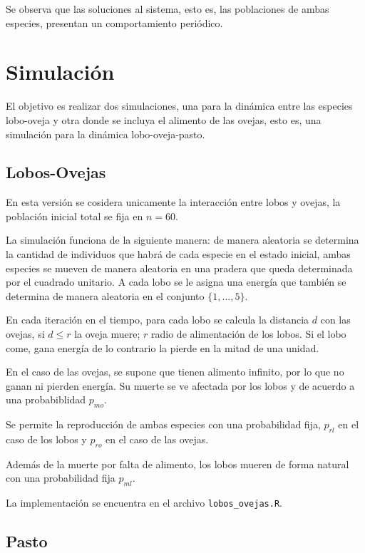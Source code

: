 \documentclass[12pt, twocolumn]{article}
\begin{document}
Se observa que las soluciones al sistema, esto es, las poblaciones de ambas especies, presentan un comportamiento peri\'odico.

\section{Simulaci\'on}
\label{sec:sim}

El objetivo es realizar dos simulaciones, una para la din\'amica entre las especies lobo-oveja y otra donde se incluya el alimento de las ovejas, esto es, una simulaci\'on para la din\'amica lobo-oveja-pasto.

\subsection{Lobos-Ovejas}
\label{subsec:lo}

En esta versi\'on se cosidera unicamente la interacci\'on entre lobos y ovejas, la poblaci\'on inicial total se fija en $n=60$. 

La simulaci\'on funciona de la siguiente manera: de manera aleatoria se determina la cantidad de individuos que habr\'a de cada especie en el estado inicial, ambas especies se mueven de manera aleatoria en una pradera que queda determinada por el cuadrado unitario. A cada lobo se le asigna una energ\'ia que tambi\'en se determina de manera aleatoria en el conjunto $\{1, ..., 5\}$. 

En cada iteraci\'on en el tiempo, para cada lobo se calcula la distancia $d$ con las ovejas, si $d \leq r$ la oveja muere; $r$ radio de alimentaci\'on de los lobos. Si el lobo come, gana energ\'ia de lo contrario la pierde en la mitad de una unidad.

En el caso de las ovejas, se supone que tienen alimento infinito, por lo que no ganan ni pierden energ\'ia. Su muerte se ve afectada por los lobos y de acuerdo a una probabiblidad $p_{mo}$.

Se permite la reproducci\'on de ambas especies con una probabilidad fija, $p_{rl}$ en el caso de los lobos y $p_{ro}$ en el caso de las ovejas. %

Adem\'as de la muerte por falta de alimento, los lobos mueren de forma natural con una probabilidad fija $p_{ml}$. 

La implementaci\'on se encuentra en el archivo \texttt{lobos\_ovejas.R}.

\subsection{Pasto}
\label{subsec:pasto}
\end{document}
